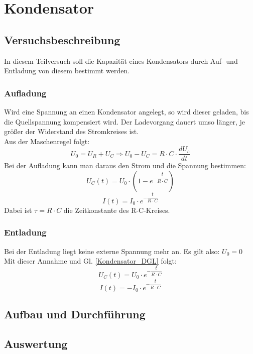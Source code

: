 \documentclass[12pt,a4paper]{article}
\author{Tim}
\begin{document}
\tableofcontents
\newpage

\section{Kondensator}
\subsection{Versuchsbeschreibung}
In diesem Teilversuch soll die Kapazität eines Kondensators durch Auf- und Entladung von diesem bestimmt werden.
\subsubsection{Aufladung}
Wird eine Spannung an einen Kondensator angelegt, so wird dieser geladen, bis die Quellspannung kompensiert wird. Der Ladevorgang dauert umso länger, je größer der Widerstand des Stromkreises ist.\\
Aus der Maschenregel folgt:
\begin{equation}
U_0 = U_R + U_C \Rightarrow U_0 - U_C = R\cdot C\cdot \dfrac{dU_c}{dt}
\label{Kondensator_DGL}
\end{equation}
Bei der Aufladung kann man daraus den Strom und die Spannung bestimmen:
\begin{equation}
U_C(t) = U_0 \cdot (1-e^{-\dfrac{t}{R\cdot C}})
\end{equation}
\begin{equation}
I(t) = I_0 \cdot e^{-\dfrac{t}{R\cdot C}}
\end{equation}
Dabei ist $\tau = R \cdot C$ die Zeitkonstante des R-C-Kreises.
\subsubsection{Entladung}
Bei der Entladung liegt keine externe Spannung mehr an. Es gilt also: $U_0 = 0$\\
Mit dieser Annahme und Gl. \ref{Kondensator_DGL} folgt:
\begin{equation}
U_C(t) = U_0 \cdot e^{-\dfrac{t}{R\cdot C}}
\end{equation}
\begin{equation}
I(t) = -I_0 \cdot e^{-\dfrac{t}{R\cdot C}}
\end{equation}
\subsection{Aufbau und Durchführung}

\subsection{Auswertung}
\end{document}
